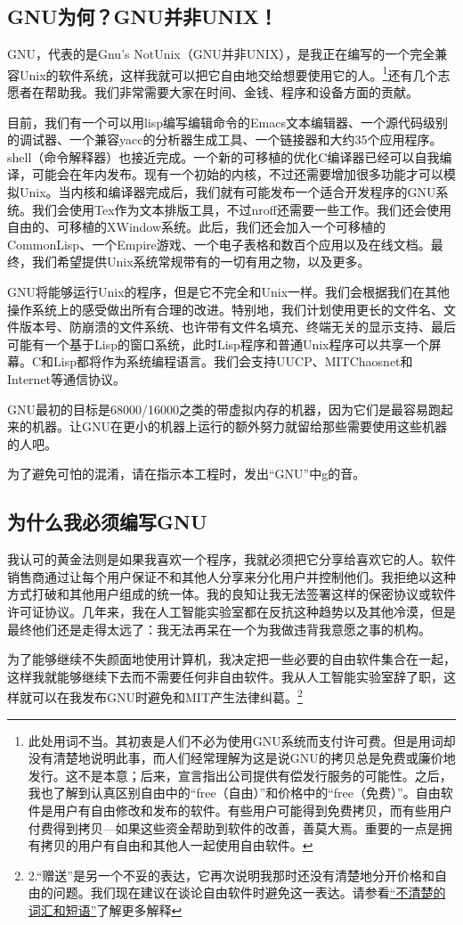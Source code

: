 \subsection{GNU为何？GNU并非UNIX！}
GNU，代表的是Gnu's NotUnix（GNU并非UNIX），是我正在编写的一个完全兼容Unix的软件系统，这样我就可以把它自由地交给想要使用它的人。\footnote{此处用词不当。其初衷是人们不必为使用GNU系统而支付许可费。但是用词却没有清楚地说明此事，而人们经常理解为这是说GNU的拷贝总是免费或廉价地发行。这不是本意；后来，宣言指出公司提供有偿发行服务的可能性。之后，我也了解到认真区别自由中的“free（自由）”和价格中的“free（免费）”。自由软件是用户有自由修改和发布的软件。有些用户可能得到免费拷贝，而有些用户付费得到拷贝—如果这些资金帮助到软件的改善，善莫大焉。重要的一点是拥有拷贝的用户有自由和其他人一起使用自由软件。}还有几个志愿者在帮助我。我们非常需要大家在时间、金钱、程序和设备方面的贡献。\par
目前，我们有一个可以用lisp编写编辑命令的Emacs文本编辑器、一个源代码级别的调试器、一个兼容yacc的分析器生成工具、一个链接器和大约35个应用程序。shell（命令解释器）也接近完成。一个新的可移植的优化C编译器已经可以自我编译，可能会在年内发布。现有一个初始的内核，不过还需要增加很多功能才可以模拟Unix。当内核和编译器完成后，我们就有可能发布一个适合开发程序的GNU系统。我们会使用Tex作为文本排版工具，不过nroff还需要一些工作。我们还会使用自由的、可移植的XWindow系统。此后，我们还会加入一个可移植的CommonLisp、一个Empire游戏、一个电子表格和数百个应用以及在线文档。最终，我们希望提供Unix系统常规带有的一切有用之物，以及更多。\par
GNU将能够运行Unix的程序，但是它不完全和Unix一样。我们会根据我们在其他操作系统上的感受做出所有合理的改进。特别地，我们计划使用更长的文件名、文件版本号、防崩溃的文件系统、也许带有文件名填充、终端无关的显示支持、最后可能有一个基于Lisp的窗口系统，此时Lisp程序和普通Unix程序可以共享一个屏幕。C和Lisp都将作为系统编程语言。我们会支持UUCP、MITChaosnet和Internet等通信协议。\par
GNU最初的目标是68000/16000之类的带虚拟内存的机器，因为它们是最容易跑起来的机器。让GNU在更小的机器上运行的额外努力就留给那些需要使用这些机器的人吧。\par
为了避免可怕的混淆，请在指示本工程时，发出“GNU”中g的音。
\subsection{为什么我必须编写GNU}
我认可的黄金法则是如果我喜欢一个程序，我就必须把它分享给喜欢它的人。软件销售商通过让每个用户保证不和其他人分享来分化用户并控制他们。我拒绝以这种方式打破和其他用户组成的统一体。我的良知让我无法签署这样的保密协议或软件许可证协议。几年来，我在人工智能实验室都在反抗这种趋势以及其他冷漠，但是最终他们还是走得太远了：我无法再呆在一个为我做违背我意愿之事的机构。\par
为了能够继续不失颜面地使用计算机，我决定把一些必要的自由软件集合在一起，这样我就能够继续下去而不需要任何非自由软件。我从人工智能实验室辞了职，这样就可以在我发布GNU时避免和MIT产生法律纠葛。\footnote{2.“赠送”是另一个不妥的表达，它再次说明我那时还没有清楚地分开价格和自由的问题。我们现在建议在谈论自由软件时避免这一表达。请参看\href{http://www.gnu.org/philosophy/words-to-avoid.html\#GiveAwaySoftware}{“不清楚的词汇和短语”}了解更多解释}\par

